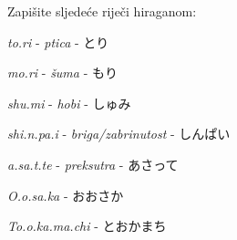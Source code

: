 
\author{Katja Kržišnik, Marko Barbančić}


	\begin{mondai}{Zapišite sljedeće riječi hiraganom:}
		\item \textit{to.ri} - \textit{ptica} - とり
		\item \textit{mo.ri} - \textit{šuma} - もり
		\item \textit{shu.mi} - \textit{hobi} - しゅみ
		\item \textit{shi.n.pa.i} - \textit{briga/zabrinutost} - しんぱい
		\item \textit{a.sa.t.te} - \textit{preksutra} - あさって
		\item \textit{O.o.sa.ka} - おおさか
		\item \textit{To.o.ka.ma.chi} - とおかまち
	\end{mondai}

